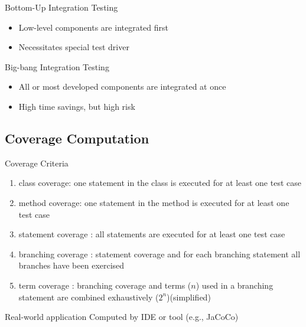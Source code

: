 \begin{frame}{\insertsubsection}
\begin{fancycolumns}[animation=none]
		\begin{definition}{Bottom-Up Integration Testing}
			\begin{itemize}
				\item Low-level components are integrated first
				\item Necessitates special test driver
			\end{itemize}
		\end{definition} 
		\begin{definition}{Big-bang Integration Testing}
			\begin{itemize}
				\item All or most developed components are integrated at once
				\item High time savings, but high risk
			\end{itemize}
		\end{definition} 
	\end{fancycolumns}
\end{frame}

\subsection{Coverage Computation}
\begin{frame}{\insertsubsection}
	\begin{fancycolumns}[animation=none]
		\begin{definition}{Coverage Criteria \mysource{\ludewiglichter}} %
			\begin{enumerate}
				\item class coverage: one statement in the class is executed for at least one test case
				\item method coverage: one statement in the method is executed for at least one test case
				\item statement coverage : all statements are executed for at least one test case
				\item branching coverage : statement coverage and for each branching statement all branches have been exercised
				\item term coverage : branching coverage and terms ($n$) used in a branching statement are combined exhaustively ($2^n$)\hfill(simplified)
			\end{enumerate}
		\end{definition} \pause
		\nextcolumn
		\begin{note}{Real-world application}%
			Computed by IDE or tool (e.g., JaCoCo)
		\end{note}
	\end{fancycolumns}
\end{frame}



